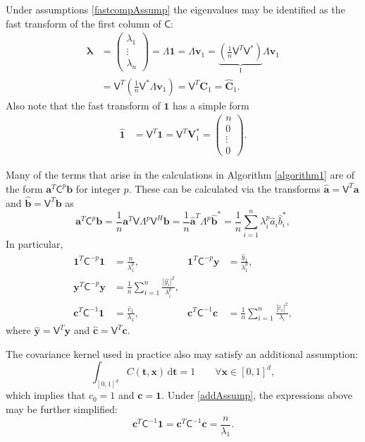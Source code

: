 \documentclass[twocolumn]{svjour3}          %
\newcommand{\bm}[1]{\boldsymbol{#1}}
\newcommand{\D}[1]{\text{d}{#1}}
\newcommand{\vlambda}{{\bm{\lambda}}}
\newcommand{\va}{\bm{a}}
\newcommand{\vb}{\bm{b}}
\newcommand{\vc}{\bm{c}}
\newcommand{\vC}{\bm{C}}
\newcommand{\vt}{\bm{t}}
\newcommand{\vv}{\bm{v}}
\newcommand{\vV}{\bm{V}}
\newcommand{\vx}{\bm{x}}
\newcommand{\vy}{\bm{y}}
\newcommand{\vone}{\bm{1}}
\newcommand{\mC}{\mathsf{C}}
\newcommand{\mCInv}{{\mathsf{C}^{-1}}}
\newcommand{\mLambda}{\mathsf{\Lambda}}
\newcommand{\mV}{\mathsf{V}}
\def\abs#1{\ensuremath{\left \lvert #1 \right \rvert}}
\begin{document}
Under assumptions \eqref{fastcompAssump} the eigenvalues may be identified as the fast transform of the first column of $\mC$:
\begin{align}
\nonumber
 \vlambda 
 & = \begin{pmatrix}
 \lambda_1 \\ \vdots \\ \lambda_n
 \end{pmatrix} = \mLambda \vone = \mLambda \vv_1 
 = \underbrace{\left( \frac 1n \mV^T  \mV^* \right) }_{\mathsf{I}} \mLambda \vv_1 \\
  &= \mV^T \left( \frac 1n \mV^* \mLambda \vv_1 \right)
 = \mV^T \vC_1 =  \widehat{\vC}_1.
 \label{eqn:fast_transform_to_eigvalues}
\end{align}
Also note that the fast transform of $\vone$ has a simple form
\begin{align}
\widehat{\vone}
& = \mV^T \vone = \mV^T \vV_1^* = \begin{pmatrix}n  \\ 0 \\ \vdots \\ 0 \end{pmatrix}.
\label{eqn:fast_transform_one}
\end{align}

Many of the terms that arise in the calculations in  Algorithm \ref{algorithm1} are of the form $\va^T\mC^{p}\vb$ for integer $p$.  These can be calculated via the transforms $\widehat{\va} = \mV^T \va$ and $\widehat{\vb} = \mV^T \vb$ as 
\begin{equation*}
\va^T\mC^p\vb = \frac 1n \va^T \mV \mLambda^p \mV^H \vb
= \frac 1n \widehat{\va}^T\mLambda^p \widehat{\vb}^*
= \frac 1n \sum_{i=1}^n \lambda_i^p \widehat{a}_i \widehat{b}_i^*, 
\end{equation*}
In particular,
\begin{align*}
\vone^T\mC^{-p}\vone & = \frac{n}{\lambda_1^p},
&
\vone^T\mC^{-p}\vy &= \frac{\widehat{y}_1}{\lambda_1^p},
\\
\vy^T\mC^{-p} \vy &= \frac 1n \sum_{i=1}^n \frac{\abs{\widehat{y_i}}^2}{\lambda_i^p},
\\
\vc^T\mCInv \vone &= \frac{\widehat{c}_1}{\lambda_1},
&
\vc^T\mCInv \vc &= \frac 1n \sum_{i=1}^n \frac{\abs{\widehat{c}_i}^2}{\lambda_i},
\end{align*}
where $\widehat{\vy} = \mV^T \vy$ and 
$\widehat{\vc} = \mV^T \vc$. 

The covariance kernel used in practice also may satisfy an additional assumption:
\begin{equation} \label{addAssump}
\int_{[0,1]^d} C(\vt,\vx) \, \D \vt = 1 \qquad \forall \vx \in [0,1]^d,
\end{equation}
which implies that $c_0 = 1$ and $\vc = \vone$.  Under \eqref{addAssump}, the expressions above may be further simplified:
\begin{equation*}
\vc^T\mCInv \vone =
\vc^T\mCInv \vc = \frac{n}{\lambda_1}.
\end{equation*}
\end{document}

